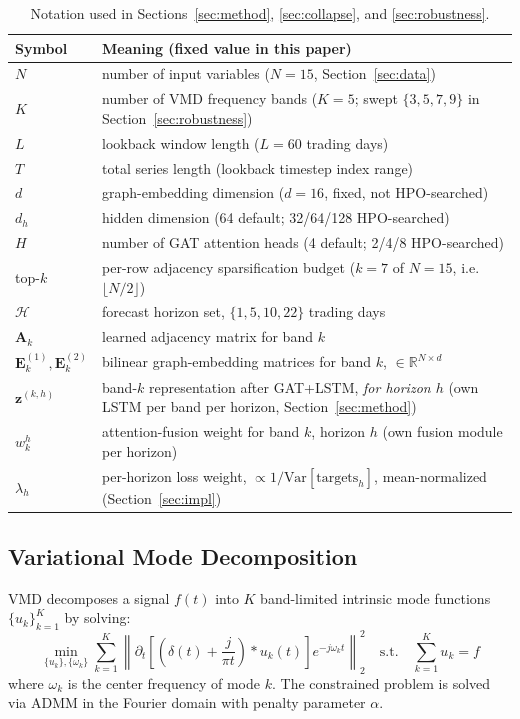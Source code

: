 \documentclass[journal]{IEEEtran}
\begin{document}
\begin{table}[t]
\centering
\caption{Notation used in Sections~\ref{sec:method}, \ref{sec:collapse}, and \ref{sec:robustness}.}
\label{tab:notation}
\small
\begin{tabular}{@{}lp{6.3cm}@{}}
\toprule
Symbol & Meaning (fixed value in this paper) \\
\midrule
$N$ & number of input variables ($N=15$, Section~\ref{sec:data}) \\
$K$ & number of VMD frequency bands ($K=5$; swept $\{3,5,7,9\}$ in Section~\ref{sec:robustness}) \\
$L$ & lookback window length ($L=60$ trading days) \\
$T$ & total series length (lookback timestep index range) \\
$d$ & graph-embedding dimension ($d=16$, fixed, not HPO-searched) \\
$d_h$ & hidden dimension (64 default; 32/64/128 HPO-searched) \\
$H$ & number of GAT attention heads (4 default; 2/4/8 HPO-searched) \\
top-$k$ & per-row adjacency sparsification budget ($k=7$ of $N=15$, i.e.\ $\lfloor N/2\rfloor$) \\
$\mathcal{H}$ & forecast horizon set, $\{1,5,10,22\}$ trading days \\
$\mathbf{A}_k$ & learned adjacency matrix for band $k$ \\
$\mathbf{E}^{(1)}_k,\mathbf{E}^{(2)}_k$ & bilinear graph-embedding matrices for band $k$, $\in\mathbb{R}^{N\times d}$ \\
$\mathbf{z}^{(k,h)}$ & band-$k$ representation after GAT+LSTM, \emph{for horizon $h$} (own LSTM per band per horizon, Section~\ref{sec:method}) \\
$w_k^h$ & attention-fusion weight for band $k$, horizon $h$ (own fusion module per horizon) \\
$\lambda_h$ & per-horizon loss weight, $\propto 1/\text{Var}[\text{targets}_h]$, mean-normalized (Section~\ref{sec:impl}) \\
\bottomrule
\end{tabular}
\end{table}

\subsection{Variational Mode Decomposition}

VMD \citep{Dragomiretskiy2014} decomposes a signal $f(t)$ into $K$ band-limited intrinsic mode functions $\{u_k\}_{k=1}^{K}$ by solving:
\begin{equation}
\min_{\{u_k\}, \{\omega_k\}} \sum_{k=1}^{K} \left\| \partial_t \left[ \left(\delta(t) + \frac{j}{\pi t}\right) * u_k(t) \right] e^{-j\omega_k t} \right\|_2^2 \quad \text{s.t.} \quad \sum_{k=1}^{K} u_k = f
\end{equation}
where $\omega_k$ is the center frequency of mode $k$. The constrained problem is solved via ADMM in the Fourier domain with penalty parameter $\alpha$.
\end{document}
